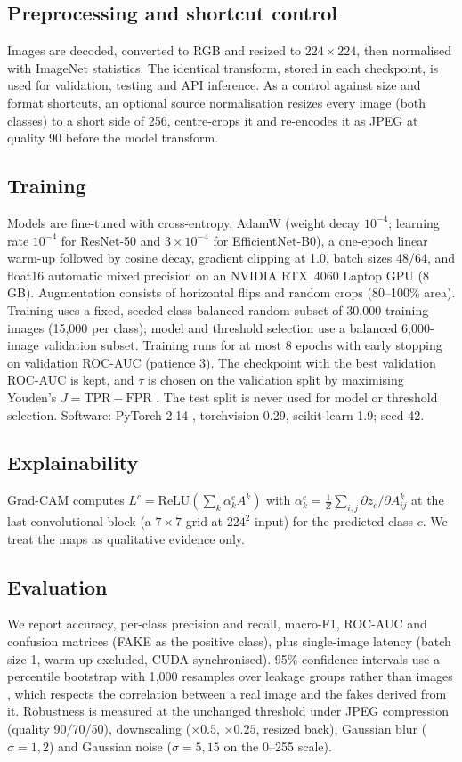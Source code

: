 \documentclass[conference]{IEEEtran}
\begin{document}
\subsection{Preprocessing and shortcut control}
Images are decoded, converted to RGB and resized to $224\times224$, then normalised with ImageNet statistics. The identical transform, stored in each checkpoint, is used for validation, testing and API inference. As a control against size and format shortcuts, an optional source normalisation resizes every image (both classes) to a short side of 256, centre-crops it and re-encodes it as JPEG at quality 90 before the model transform.

\subsection{Training}\label{sec:training}
Models are fine-tuned with cross-entropy, AdamW \cite{loshchilov2019adamw} (weight decay $10^{-4}$; learning rate $10^{-4}$ for ResNet-50 and $3{\times}10^{-4}$ for EfficientNet-B0), a one-epoch linear warm-up followed by cosine decay, gradient clipping at 1.0, batch sizes 48/64, and float16 automatic mixed precision on an NVIDIA RTX~4060 Laptop GPU (8\,GB). Augmentation consists of horizontal flips and random crops (80--100\% area). Training uses a fixed, seeded class-balanced random subset of 30{,}000 training images (15{,}000 per class); model and threshold selection use a balanced 6{,}000-image validation subset. Training runs for at most 8 epochs with early stopping on validation ROC-AUC (patience 3). The checkpoint with the best validation ROC-AUC is kept, and $\tau$ is chosen on the validation split by maximising Youden's $J=\mathrm{TPR}-\mathrm{FPR}$ \cite{youden1950index}. The test split is never used for model or threshold selection. Software: PyTorch 2.14 \cite{paszke2019pytorch}, torchvision 0.29, scikit-learn 1.9; seed 42.

\subsection{Explainability}
Grad-CAM \cite{selvaraju2017gradcam} computes $L^c=\mathrm{ReLU}(\sum_k\alpha_k^cA^k)$ with $\alpha_k^c=\frac{1}{Z}\sum_{i,j}\partial z_c/\partial A^k_{ij}$ at the last convolutional block (a $7\times7$ grid at $224^2$ input) for the predicted class $c$. We treat the maps as qualitative evidence only.

\subsection{Evaluation}
We report accuracy, per-class precision and recall, macro-F1, ROC-AUC and confusion matrices (FAKE as the positive class), plus single-image latency (batch size 1, warm-up excluded, CUDA-synchronised). 95\% confidence intervals use a percentile bootstrap with 1{,}000 resamples over leakage groups rather than images \cite{efron1993bootstrap}, which respects the correlation between a real image and the fakes derived from it. Robustness is measured at the unchanged threshold under JPEG compression (quality 90/70/50), downscaling ($\times0.5$, $\times0.25$, resized back), Gaussian blur ($\sigma=1,2$) and Gaussian noise ($\sigma=5,15$ on the 0--255 scale).
\end{document}
